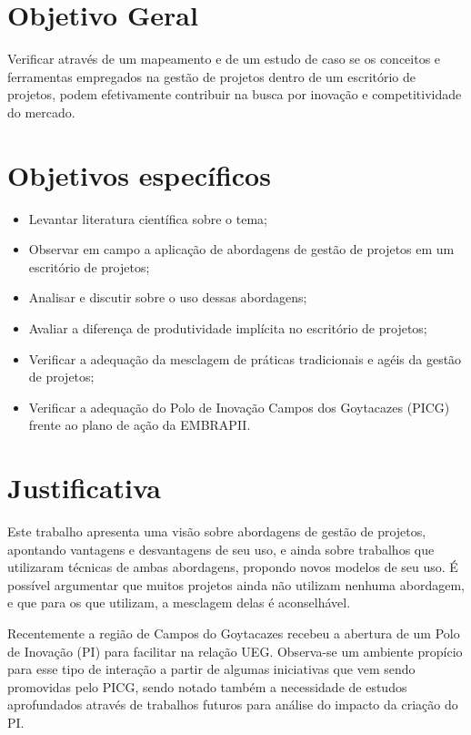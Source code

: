 \section{Objetivo Geral}

Verificar através de um mapeamento e de um estudo de caso se os conceitos e ferramentas empregados na gestão de projetos dentro de um escritório de projetos, podem efetivamente contribuir na busca por inovação e competitividade do mercado.


\section{Objetivos específicos}

\begin{itemize}
  \item{Levantar literatura científica sobre o tema;}
  \item{Observar em campo a aplicação de abordagens de gestão de projetos em um escritório de projetos;}
  \item{Analisar e discutir sobre o uso dessas abordagens;}
  \item{Avaliar a diferença de produtividade implícita no escritório de projetos;}
  \item{Verificar a adequação da mesclagem de práticas tradicionais e agéis da gestão de projetos;}
  \item{Verificar a adequação do Polo de Inovação Campos dos Goytacazes (PICG) frente ao plano de ação da EMBRAPII.}
\end{itemize}

\section{Justificativa}

Este trabalho apresenta uma visão sobre abordagens de gestão de projetos, apontando vantagens e desvantagens de seu uso, e ainda sobre trabalhos que utilizaram técnicas de ambas abordagens, propondo novos modelos de seu uso. É possível argumentar que muitos projetos ainda não utilizam nenhuma abordagem, e que para os que utilizam, a mesclagem delas é aconselhável.

Recentemente a região de Campos do Goytacazes recebeu a abertura de um Polo de Inovação (PI) para facilitar na relação UEG. Observa-se um ambiente propício para esse tipo de interação a partir de algumas iniciativas que vem sendo promovidas pelo PICG, sendo notado também a necessidade de estudos aprofundados através de trabalhos futuros para análise do impacto da criação do PI.

